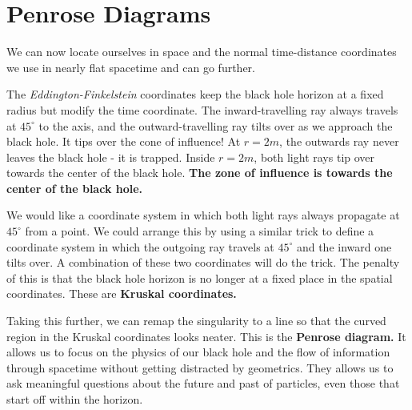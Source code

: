 \documentclass[a4paper, 11pt, normalem]{report}
\begin{document}
\section{Penrose Diagrams}
We can now locate ourselves in space and the normal time-distance coordinates we use in nearly flat spacetime and can go further. 
\begin{figure}[H]
    \centering
\end{figure}
The \emph{Eddington-Finkelstein} coordinates keep the black hole horizon at a fixed radius but modify the time coordinate. 
The inward-travelling ray always travels at $45^\circ$ to the axis, and the outward-travelling ray tilts over as we approach the black hole. 
It tips over the cone of influence! 
At $r=2m$, the outwards ray never leaves the black hole - it is trapped. 
Inside $r=2m$, both light rays tip over towards the center of the black hole. 
\textbf{The zone of influence is towards the center of the black hole.}

We would like a coordinate system in which both light rays always propagate at $45^\circ$ from a point. 
We could arrange this by using a similar trick to define a coordinate system in which the outgoing ray travels at $45^\circ$ and the inward one tilts over. 
A combination of these two coordinates will do the trick. 
The penalty of this is that the black hole horizon is no longer at a fixed place in the spatial coordinates.
These are \textbf{Kruskal coordinates.}

Taking this further, we can remap the singularity to a line so that the curved region in the Kruskal coordinates looks neater. 
This is the \textbf{Penrose diagram.}
It allows us to focus on the physics of our black hole and the flow of information through spacetime without getting distracted by geometrics. 
They allows us to ask meaningful questions about the future and past of particles, even those that start off within the horizon. 
\end{document}

